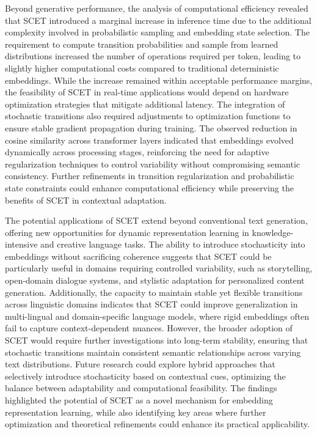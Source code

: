\documentclass{article}
\begin{document}
Beyond generative performance, the analysis of computational efficiency revealed that SCET introduced a marginal increase in inference time due to the additional complexity involved in probabilistic sampling and embedding state selection. The requirement to compute transition probabilities and sample from learned distributions increased the number of operations required per token, leading to slightly higher computational costs compared to traditional deterministic embeddings. While the increase remained within acceptable performance margins, the feasibility of SCET in real-time applications would depend on hardware optimization strategies that mitigate additional latency. The integration of stochastic transitions also required adjustments to optimization functions to ensure stable gradient propagation during training. The observed reduction in cosine similarity across transformer layers indicated that embeddings evolved dynamically across processing stages, reinforcing the need for adaptive regularization techniques to control variability without compromising semantic consistency. Further refinements in transition regularization and probabilistic state constraints could enhance computational efficiency while preserving the benefits of SCET in contextual adaptation.

The potential applications of SCET extend beyond conventional text generation, offering new opportunities for dynamic representation learning in knowledge-intensive and creative language tasks. The ability to introduce stochasticity into embeddings without sacrificing coherence suggests that SCET could be particularly useful in domains requiring controlled variability, such as storytelling, open-domain dialogue systems, and stylistic adaptation for personalized content generation. Additionally, the capacity to maintain stable yet flexible transitions across linguistic domains indicates that SCET could improve generalization in multi-lingual and domain-specific language models, where rigid embeddings often fail to capture context-dependent nuances. However, the broader adoption of SCET would require further investigations into long-term stability, ensuring that stochastic transitions maintain consistent semantic relationships across varying text distributions. Future research could explore hybrid approaches that selectively introduce stochasticity based on contextual cues, optimizing the balance between adaptability and computational feasibility. The findings highlighted the potential of SCET as a novel mechanism for embedding representation learning, while also identifying key areas where further optimization and theoretical refinements could enhance its practical applicability.
\end{document}
